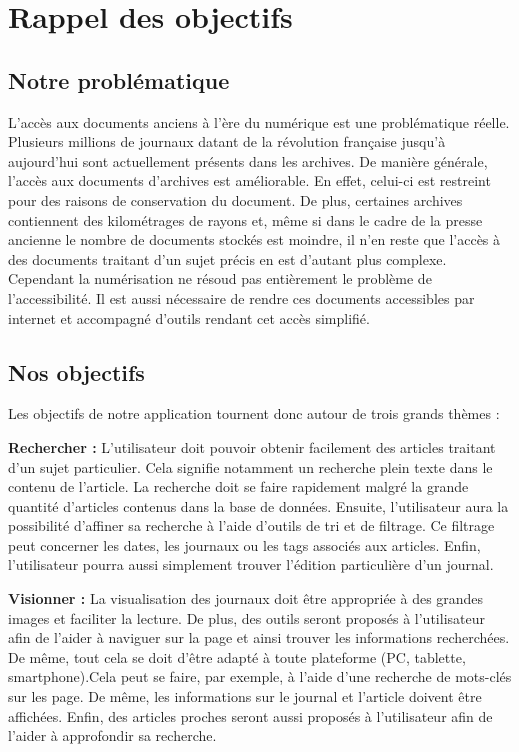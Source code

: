 \section{Rappel des objectifs}
\label{sec:rappel}

\subsection{Notre problématique}
	L’accès aux documents anciens à l’ère du numérique est une problématique réelle. Plusieurs millions de journaux datant de la révolution française jusqu’à aujourd’hui sont actuellement présents dans les archives. De manière générale, l’accès aux documents d’archives est améliorable. En effet, celui-ci est restreint pour des raisons de conservation du document. De plus, certaines archives contiennent des kilométrages de rayons et, même si dans le cadre de la presse ancienne le nombre de documents stockés est moindre, il n’en reste que l'accès à des documents traitant d'un sujet précis en est d'autant plus complexe. Cependant la numérisation ne résoud pas entièrement le problème de l’accessibilité. Il est aussi nécessaire de rendre ces documents accessibles par internet et accompagné d'outils rendant cet accès simplifié.

\subsection{Nos objectifs}

	Les objectifs de notre application tournent donc autour de trois grands thèmes :
	
	\textbf{Rechercher :} L'utilisateur doit pouvoir obtenir facilement des articles traitant d'un sujet particulier. Cela signifie notamment un recherche plein texte dans le contenu de l'article. La recherche doit se faire rapidement malgré la grande quantité d'articles contenus dans la base de données. Ensuite, l'utilisateur aura la possibilité d'affiner sa recherche à l'aide d'outils de tri et de filtrage. Ce filtrage peut concerner les dates, les journaux ou les tags associés aux articles. Enfin, l'utilisateur pourra aussi simplement trouver l'édition particulière d'un journal.
	
	\textbf{Visionner :} La visualisation des journaux doit être appropriée à des grandes images et faciliter la lecture. De plus, des outils seront proposés à l'utilisateur afin de l'aider à naviguer sur la page et ainsi trouver les informations recherchées. De même, tout cela se doit d’être adapté à toute plateforme (PC, tablette, smartphone).Cela peut se faire, par exemple, à l'aide d'une recherche de mots-clés sur les page. De même, les informations sur le journal et l'article doivent être affichées. Enfin, des articles proches seront aussi proposés à l'utilisateur afin de l'aider à approfondir sa recherche.

